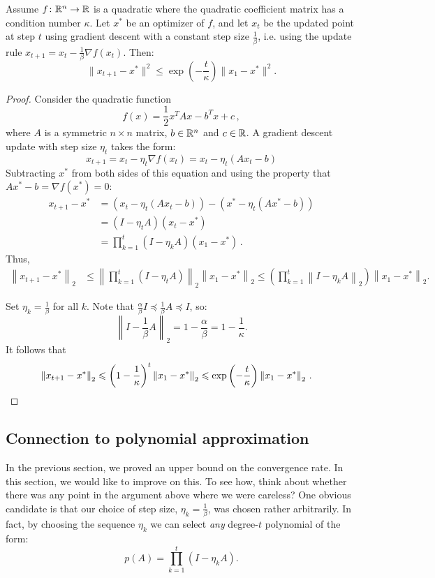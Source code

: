 \begin{theorem}
Assume $f\colon\R^n\to\R$ is a quadratic where the quadratic coefficient matrix has a condition number $\kappa$. Let $x^{*}$ be an optimizer of $f$, and let $x_{t}$ be the updated point at step $t$ using gradient descent with a constant step size $\frac{1}{\beta}$, i.e. using the update rule $x_{t+1} = x_t - \frac{1}{\beta}\nabla f(x_t)$. Then:
\begin{equation*}
\|x_{t+1} - x^*\|^2 \leq \exp\left(-\frac{t}{\kappa}\right)\|x_1 - x^*\|^2.
\end{equation*}
\end{theorem}
\begin{proof}
Consider the quadratic function
\[
f(x) = \frac{1}{2}x^T A x - b^T x + c\,,
\]
where $A$ is a symmetric $n\times n$ matrix, $b \in \R^n$ and $c \in \R$. 
A gradient descent update with step size $\eta_t$ takes the form:
\[
x_{t+1} = x_t - \eta_t \nabla f(x_t) = x_t - \eta_t \left(Ax_t - b\right)
\]
Subtracting $x^*$ from both sides of this equation and using the property that $Ax^* - b = \nabla f(x^*) = 0$:
\begin{align*}
x_{t+1} - x^* &= \left(x_t - \eta_t\left(Ax_t - b\right)\right) - \left(x^* - \eta_t\left(Ax^* - b\right)\right) \\
&= (I - \eta_t A)(x_t - x^*)\\
&= \prod_{k=1}^t (I-\eta_k A)(x_1-x^*)\,.
\end{align*}
Thus,
\begin{align*}
\left\|x_{t+1} - x^*\right\|_2 &\leq \left\|\prod_{k=1}^t(I - \eta_t
A)\right\|_2 \left\|x_1 - x^*\right\|_2
\leq \left(\prod_{k=1}^t \left\| I - \eta_k A\right\|_2\right) \left\|x_1 - x^*\right\|_2.
\end{align*}

Set $\eta_k = \frac{1}{\beta}$ for all $k$. Note that $\frac{\alpha}{\beta}I \preceq \frac{1}{\beta}A \preceq I$, so:
\begin{equation*}
\left\|I - \frac{1}{\beta} A\right \|_2 = 1 - \frac{\alpha}{\beta} = 1 - \frac{1}{\kappa}.
\end{equation*}
It follows that
\begin{align*}
\left\|x_{t+1} - x^*\right\|_2 &\leq \left(1 - \frac{1}{\kappa}\right)^t \left\|x_1 - x^*\right\|_2 
\leq \exp \left(-\frac{t}{\kappa}\right) \left\|x_1 - x^*\right\|_2\,.\qedhere
\end{align*}
\end{proof}

\subsection{Connection to polynomial approximation}
In the previous section, we proved an upper bound on the convergence rate. In
this section, we would like to improve on this. To see how, think about 
whether there was any
point in the argument above where we were careless? One obvious candidate is that
our choice of step size, $\eta_k = \frac{1}{\beta}$, was chosen rather
arbitrarily. In fact, by choosing the sequence $\eta_k$ we can select
\textit{any} degree-$t$ polynomial of the form: 
\[
p(A) = \prod_{k=1}^t \left(I - \eta_k A\right).
\]

